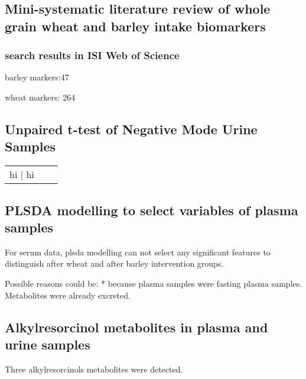 \subsection{Mini-systematic literature review of whole grain wheat and barley intake biomarkers}
\subsubsection{search results in ISI Web of Science}

barley markers:47

wheat markers: 264

\subsection{Unpaired t-test of Negative Mode Urine Samples}
\begin{tabular}{c|c|c}
	hi | hi
\end{tabular}

\subsection{PLSDA modelling to select variables of plasma samples}
For serum data, plsda modelling can not select any significant features to distinguish after wheat and after barley intervention groups.

Possible reasons could be:
* because plasma samples were fasting plasma samples. Metabolites were already excreted.

\subsection{Alkylresorcinol metabolites in plasma and urine samples}
Three alkylresorcinols metabolites were detected. 